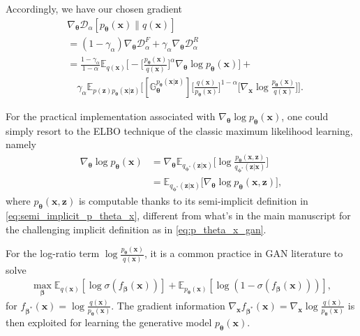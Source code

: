 \documentclass[letterpaper]{article} %
\newcommand{\beq}{\begin{equation}}
\newcommand{\eeq}{\end{equation}}
\newcommand{\bali}{\begin{aligned}}
\newcommand{\eali}{\end{aligned}}
\newcommand{\Dc}[0]{\ensuremath{\mathcal{D}} }
\newcommand{\Ebb}[0]{\ensuremath{\mathbb{E}} }
\newcommand{\Gbb}[0]{\ensuremath{\mathbb{G}} }
\newcommand{\xv}[0]{\ensuremath{\boldsymbol{x}} }
\newcommand{\zv}[0]{\ensuremath{\boldsymbol{z}} }
\newcommand{\betav}[0]{\ensuremath{\boldsymbol{\beta}} }
\newcommand{\thetav}[0]{\ensuremath{\boldsymbol{\theta}} }
\newcommand{\phiv}[0]{\ensuremath{\boldsymbol{\phi}} }
\begin{document}
Accordingly, we have our chosen gradient
\begin{equation}\label{eq:}
\begin{aligned}
    & \nabla_{\thetav} \Dc_{\alpha} [p_{\thetav}(\xv) \| q(\xv)]
    \\
    & = (1 - \gamma_{\alpha}) \nabla_{\thetav} \Dc_{\alpha}^F
    + \gamma_{\alpha} \nabla_{\thetav} \Dc_{\alpha}^R
    \\
    & = \frac{1 - \gamma_{\alpha}}{1 - {\alpha}} \Ebb_{q(\xv)} \bigg[
    -\Big[ \frac{p_{\thetav}(\xv)}{q(\xv)} \Big]^{\alpha}
    \nabla_{\thetav} \log p_{\thetav}(\xv)
    \bigg] + 
    \\
    & \quad 
    \gamma_{\alpha} \Ebb_{p(\zv) p_{\thetav}(\xv|\zv)} \bigg[
    [\Gbb^{p_{\thetav}(\xv|\zv)}_{\thetav}] 
    \Big[\frac{q(\xv)}{p_{\thetav}(\xv)} \Big]^{1-\alpha}
    \Big[ \nabla_{\xv} \log \frac{p_{\thetav}(\xv)}{q(\xv)} \Big]
    \bigg].
\end{aligned}
\end{equation}


For the practical implementation associated with $\nabla_{\thetav} \log p_{\thetav}(\xv)$, one could simply resort to the ELBO technique of the classic maximum likelihood learning, namely
\beq\label{eq:}
\bali
    \nabla_{\thetav} \log p_{\thetav}(\xv) 
    & = \nabla_{\thetav} \Ebb_{q_{\phiv^{*}}(\zv|\xv)} \Big[
    \log \frac{p_{\thetav}(\xv, \zv)}{q_{\phiv^{*}}(\zv | \xv)}
    \Big]
    \\
    & 
    = \Ebb_{q_{\phiv^{*}}(\zv|\xv)} \big[
    \nabla_{\thetav} \log p_{\thetav}(\xv, \zv)
    \big],
\eali
\eeq
where $p_{\thetav}(\xv, \zv)$ is computable thanks to its semi-implicit definition in \eqref{eq:semi_implicit_p_theta_x}, different from what's in the main manuscript for the challenging implicit definition as in \eqref{eq:p_theta_x_gan}.


For the log-ratio term $\log \frac{p_{\thetav}(\xv)}{q(\xv)}$, it is a common practice in GAN literature to solve
\begin{equation}\label{eq:}
\begin{aligned}
    \max_{\betav} \Ebb_{q(\xv)} [\log \sigma(f_{\betav}(\xv))]
    + \Ebb_{p_{\thetav} (\xv)} [\log (1-\sigma(f_{\betav}(\xv))) ],
\end{aligned}
\end{equation}
for $f_{\betav^{*}}(\xv) = \log \frac{q(\xv)}{p_{\thetav}(\xv)}$. The gradient information $\nabla_{\xv} f_{\betav^{*}}(\xv) = \nabla_{\xv} \log \frac{q(\xv)}{p_{\thetav}(\xv)}$ is then exploited for learning the generative model $p_{\thetav}(\xv)$.
\end{document}
